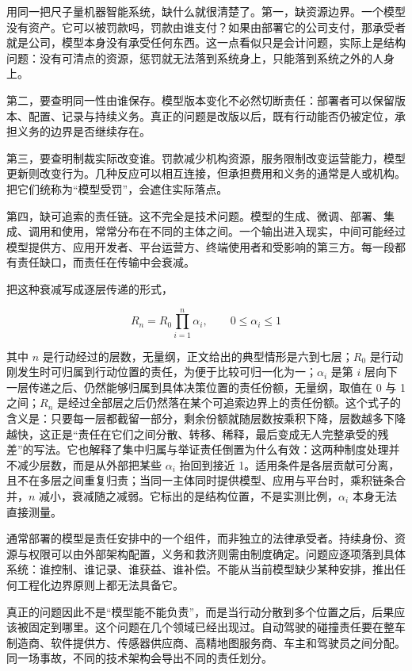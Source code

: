 
用同一把尺子量机器智能系统，缺什么就很清楚了。第一，缺资源边界。一个模型没有资产。它可以被罚款吗，罚款由谁支付？如果由部署它的公司支付，那承受者就是公司，模型本身没有承受任何东西。这一点看似只是会计问题，实际上是结构问题：没有可清点的资源，惩罚就无法落到系统身上，只能落到系统之外的人身上。

第二，要查明同一性由谁保存。模型版本变化不必然切断责任：部署者可以保留版本、配置、记录与持续义务。真正的问题是改版以后，既有行动能否仍被定位，承担义务的边界是否继续存在。

第三，要查明制裁实际改变谁。罚款减少机构资源，服务限制改变运营能力，模型更新则改变行为。几种反应可以相互连接，但承担费用和义务的通常是人或机构。把它们统称为“模型受罚”，会遮住实际落点。

第四，缺可追索的责任链。这不完全是技术问题。模型的生成、微调、部署、集成、调用和使用，常常分布在不同的主体之间。一个输出进入现实，中间可能经过模型提供方、应用开发者、平台运营方、终端使用者和受影响的第三方。每一段都有责任缺口，而责任在传输中会衰减。

把这种衰减写成逐层传递的形式，

\begin{equation}
R_n=R_0\prod_{i=1}^{n}\alpha_i,\qquad 0\le \alpha_i\le 1
\end{equation}

其中 $n$ 是行动经过的层数，无量纲，正文给出的典型情形是六到七层；$R_0$ 是行动刚发生时可归属到行动位置的责任，为便于比较可归一化为一；$\alpha_i$ 是第 $i$ 层向下一层传递之后、仍然能够归属到具体决策位置的责任份额，无量纲，取值在 0 与 1 之间；$R_n$ 是经过全部层之后仍然落在某个可追索边界上的责任份额。这个式子的含义是：只要每一层都截留一部分，剩余份额就随层数按乘积下降，层数越多下降越快，这正是“责任在它们之间分散、转移、稀释，最后变成无人完整承受的残差”的写法。它也解释了集中归属与举证责任倒置为什么有效：这两种制度处理并不减少层数，而是从外部把某些 $\alpha_i$ 抬回到接近 1。适用条件是各层贡献可分离，且不在多层之间重复归责；当同一主体同时提供模型、应用与平台时，乘积链条合并，$n$ 减小，衰减随之减弱。它标出的是结构位置，不是实测比例，$\alpha_i$ 本身无法直接测量。

通常部署的模型是责任安排中的一个组件，而非独立的法律承受者。持续身份、资源与权限可以由外部架构配置，义务和救济则需由制度确定。问题应逐项落到具体系统：谁控制、谁记录、谁获益、谁补偿。不能从当前模型缺少某种安排，推出任何工程化边界原则上都无法具备它。


真正的问题因此不是“模型能不能负责”，而是当行动分散到多个位置之后，后果应该被固定到哪里。这个问题在几个领域已经出现过。自动驾驶的碰撞责任要在整车制造商、软件提供方、传感器供应商、高精地图服务商、车主和驾驶员之间分配。同一场事故，不同的技术架构会导出不同的责任划分。

